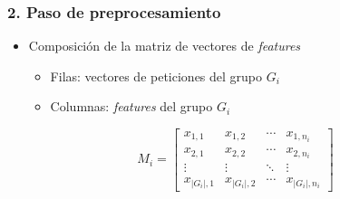 \begin{frame}
    \frametitle{2. Paso de preprocesamiento}

    \begin{itemize}[<+->]
        \item
        Composición de la matriz de vectores de \textit{features}

        \begin{itemize}[<.->]
            \item
            Filas: vectores de peticiones del grupo $G_{i}$

            \item
            Columnas: \textit{features} del grupo $G_{i}$
        \end{itemize}
    \end{itemize}

    \begin{center}
        $$
        M_{i} =
        \begin{bmatrix}
            x_{1,1}                    & x_{1,2}                    & \cdots & x_{1,n_{i}} \\
            x_{2,1}                    & x_{2,2}                    & \cdots & x_{2,n_{i}} \\
            \vdots                     & \vdots                     & \ddots & \vdots      \\
            x_{\lvert G_{i} \rvert, 1} & x_{\lvert G_{i} \rvert, 2} & \cdots & x_{\lvert G_{i} \rvert, n_{i}}
        \end{bmatrix}
        $$
    \end{center}
\end{frame}

